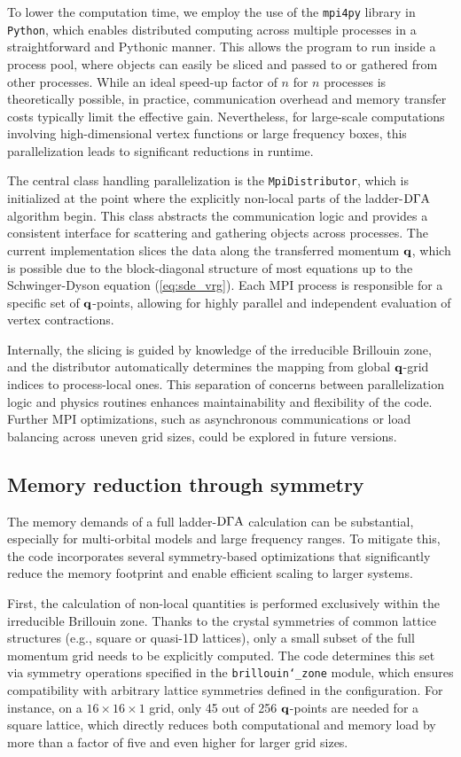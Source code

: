 \documentclass[../../main.tex]{subfiles}
\begin{document}
To lower the computation time, we employ the use of the \texttt{mpi4py} library in \texttt{Python}, which enables distributed computing across multiple processes in a straightforward and Pythonic manner. This allows the program to run inside a process pool, where objects can easily be sliced and passed to or gathered from other processes. While an ideal speed-up factor of $n$ for $n$ processes is theoretically possible, in practice, communication overhead and memory transfer costs typically limit the effective gain. Nevertheless, for large-scale computations involving high-dimensional vertex functions or large frequency boxes, this parallelization leads to significant reductions in runtime.

The central class handling parallelization is the \texttt{MpiDistributor}, which is initialized at the point where the explicitly non-local parts of the ladder-$\text{D}\Gamma\text{A}$ algorithm begin. This class abstracts the communication logic and provides a consistent interface for scattering and gathering objects across processes. The current implementation slices the data along the transferred momentum $\textbf{q}$, which is possible due to the block-diagonal structure of most equations up to the Schwinger-Dyson equation (\ref{eq:sde_vrg}). Each MPI process is responsible for a specific set of $\textbf{q}$-points, allowing for highly parallel and independent evaluation of vertex contractions.

Internally, the slicing is guided by knowledge of the irreducible Brillouin zone, and the distributor automatically determines the mapping from global $\textbf{q}$-grid indices to process-local ones. This separation of concerns between parallelization logic and physics routines enhances maintainability and flexibility of the code. Further MPI optimizations, such as asynchronous communications or load balancing across uneven grid sizes, could be explored in future versions. 

\subsection{Memory reduction through symmetry}

The memory demands of a full ladder-$\text{D}\Gamma\text{A}$ calculation can be substantial, especially for multi-orbital models and large frequency ranges. To mitigate this, the code incorporates several symmetry-based optimizations that significantly reduce the memory footprint and enable efficient scaling to larger systems.

First, the calculation of non-local quantities is performed exclusively within the irreducible Brillouin zone. Thanks to the crystal symmetries of common lattice structures (e.g., square or quasi-1D lattices), only a small subset of the full momentum grid needs to be explicitly computed. The code determines this set via symmetry operations specified in the \texttt{brillouin\char`_zone} module, which ensures compatibility with arbitrary lattice symmetries defined in the configuration. For instance, on a $16\times16\times1$ grid, only 45 out of 256 $\textbf{q}$-points are needed for a square lattice, which directly reduces both computational and memory load by more than a factor of five and even higher for larger grid sizes.
\end{document}
